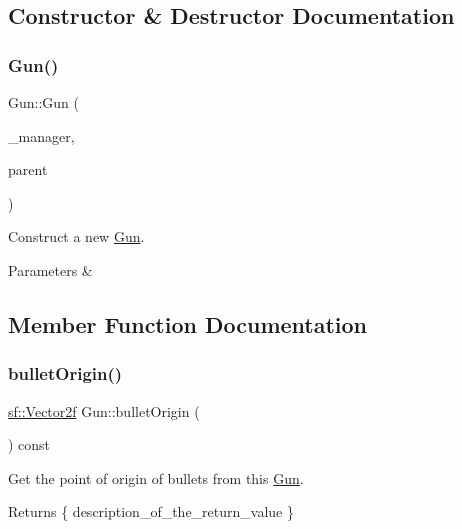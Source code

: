 \subsection{Constructor \& Destructor Documentation}
\mbox{\label{class_gun_a712fed11162d53460659683a9cdac7ba}} 
\subsubsection{\texorpdfstring{Gun()}{Gun()}}
{\footnotesize\ttfamily Gun\+::\+Gun (\begin{DoxyParamCaption}\item[{\mbox{\hyperlink{class_game_manager}{Game\+Manager}} $\ast$}]{\+\_\+manager,  }\item[{\mbox{\hyperlink{class_game_entity}{Game\+Entity}} $\ast$}]{parent }\end{DoxyParamCaption})\hspace{0.3cm}{\ttfamily [protected]}}



Construct a new \mbox{\hyperlink{class_gun}{Gun}}. 


\begin{DoxyParams}{Parameters}
{\em } & \\
\hline
\end{DoxyParams}


\subsection{Member Function Documentation}
\mbox{\label{class_gun_a9cfd56953f4a4bceeff88c4b2946676e}} 
\subsubsection{\texorpdfstring{bulletOrigin()}{bulletOrigin()}}
{\footnotesize\ttfamily \mbox{\hyperlink{classsf_1_1_vector2}{sf\+::\+Vector2f}} Gun\+::bullet\+Origin (\begin{DoxyParamCaption}{ }\end{DoxyParamCaption}) const}



Get the point of origin of bullets from this \mbox{\hyperlink{class_gun}{Gun}}. 

\begin{DoxyReturn}{Returns}
\{ description\+\_\+of\+\_\+the\+\_\+return\+\_\+value \} 
\end{DoxyReturn}
\mbox{\label{class_gun_a14269170e2da53ea0391cb6fec21ae86}} 
